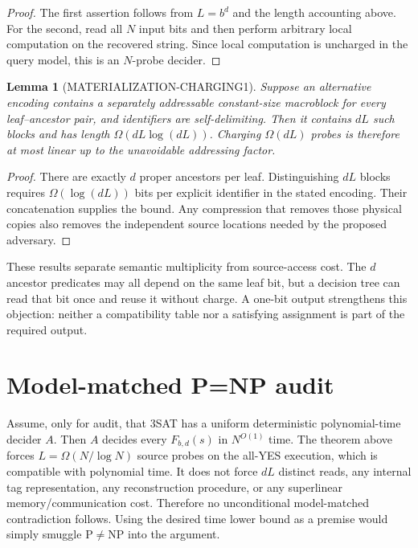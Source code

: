 \documentclass[11pt]{article}
\newtheorem{lemma}{Lemma}
\begin{document}
\begin{proof}
The first assertion follows from $L=b^d$ and the length accounting above.  For the second, read all $N$ input bits and then perform arbitrary local computation on the recovered string.  Since local computation is uncharged in the query model, this is an $N$-probe decider.
\end{proof}

\begin{lemma}[MATERIALIZATION-CHARGING1]
Suppose an alternative encoding contains a separately addressable constant-size macroblock for every leaf--ancestor pair, and identifiers are self-delimiting.  Then it contains $dL$ such blocks and has length $\Omega(dL\log(dL))$.  Charging $\Omega(dL)$ probes is therefore at most linear up to the unavoidable addressing factor.
\end{lemma}

\begin{proof}
There are exactly $d$ proper ancestors per leaf.  Distinguishing $dL$ blocks requires $\Omega(\log(dL))$ bits per explicit identifier in the stated encoding.  Their concatenation supplies the bound.  Any compression that removes those physical copies also removes the independent source locations needed by the proposed adversary.
\end{proof}

These results separate semantic multiplicity from source-access cost.  The $d$ ancestor predicates may all depend on the same leaf bit, but a decision tree can read that bit once and reuse it without charge.  A one-bit output strengthens this objection: neither a compatibility table nor a satisfying assignment is part of the required output.

\section{Model-matched P=NP audit}

Assume, only for audit, that 3SAT has a uniform deterministic polynomial-time decider $A$.  Then $A$ decides every $F_{b,d}(s)$ in $N^{O(1)}$ time.  The theorem above forces $L=\Omega(N/\log N)$ source probes on the all-YES execution, which is compatible with polynomial time.  It does not force $dL$ distinct reads, any internal tag representation, any reconstruction procedure, or any superlinear memory/communication cost.  Therefore no unconditional model-matched contradiction follows.  Using the desired time lower bound as a premise would simply smuggle P$\ne$NP into the argument.
\end{document}
